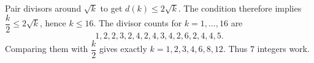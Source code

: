 Pair divisors around $\sqrt k$ to get $d(k)\le2\sqrt k$. The condition therefore implies $\dfrac{k}{2}\le2\sqrt k$, hence $k\le16$. The divisor counts for $k=1,\ldots,16$ are
\[1,2,2,3,2,4,2,4,3,4,2,6,2,4,4,5.\]
Comparing them with $\dfrac{k}{2}$ gives exactly $k=1,2,3,4,6,8,12$. Thus $\boxed7$ integers work.
